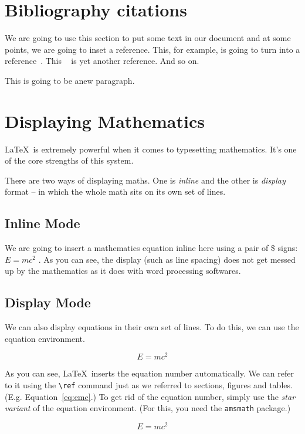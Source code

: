 \documentclass{styles/llncs}
\begin{document}
\section{Bibliography citations}
We are going to use this section to put some text in our document and at some points, we are going to inset a reference. This, for example, is going to turn into a reference~\cite{lecun2015deep}. This ~\cite{webster1984specific} is yet another reference. And so on.~\cite{nauman2010apex}

This is going to be anew paragraph.




\section{Displaying Mathematics}

\LaTeX\ is extremely powerful when it comes to typesetting mathematics. It's one of the core strengths of this system. 

There are two ways of displaying maths. One is \emph{inline} and the other is \emph{display} format -- in which the whole math sits on its own set of lines.


\subsection{Inline Mode}
We are going to insert a mathematics equation inline here using a pair of \$ signs: $E=mc^2$   . As you can see, the display (such as line spacing) does not get messed up by the mathematics as it does with word processing softwares. 

\subsection{Display Mode}
We can also display equations in their own set of lines. To do this, we can use the equation environment. 

\begin{equation}\label{eq:emc}
E=mc^2
\end{equation}

As you can see, \LaTeX\ inserts the equation number automatically. We can refer to it using the \verb|\ref| command just as we referred to sections, figures and tables. (E.g. Equation~\ref{eq:emc}.) To get rid of the equation number, simply use the \emph{star variant} of the equation environment. (For this, you need the \texttt{amsmath} package.)

\begin{equation*}
E=mc^2
\end{equation*}
\end{document}
